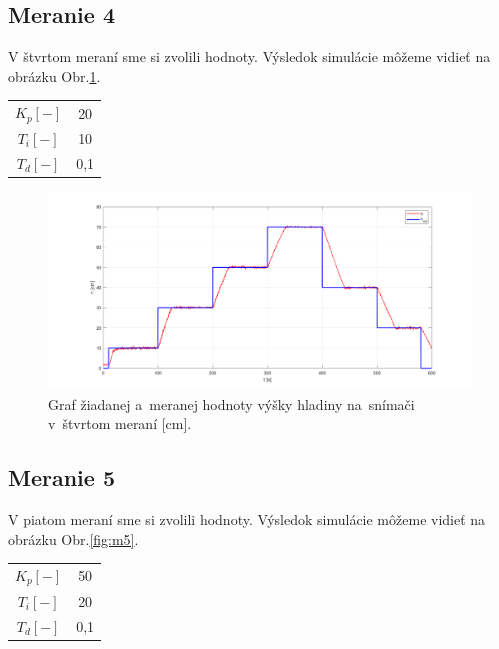 \documentclass{article}
\begin{document}
\clearpage

\subsection{Meranie 4}
\label{sec:meranie4}

V štvrtom meraní sme si zvolili hodnoty. 
Výsledok simulácie môžeme vidieť na obrázku Obr.\ref{fig:m4}.

\begin{center}
\begin{tabular}{ |c|c| }
 \hline
 $K_p [-]$ & 20 \\
 $T_i [-]$ & 10 \\
 $T_d [-]$ & 0,1 \\
 \hline
\end{tabular}
\end{center}



\begin{figure}[!htbp]
	\begin{center}
		\includegraphics[width=\textwidth]{./include/meranie4.png}
	\end{center}
	\caption{Graf žiadanej a~meranej hodnoty výšky hladiny na~snímači v~štvrtom meraní [cm].}
	\label{fig:m4}
\end{figure}

\clearpage

\subsection{Meranie 5}
\label{sec:meranie5}

V piatom meraní sme si zvolili hodnoty. 
Výsledok simulácie môžeme vidieť na obrázku Obr.\ref{fig:m5}.
\begin{center}
\begin{tabular}{ |c|c| }
 \hline
 $K_p [-]$ & 50 \\
 $T_i [-]$ & 20 \\
 $T_d [-]$ & 0,1 \\
 \hline
\end{tabular}
\end{center}
\end{document}
